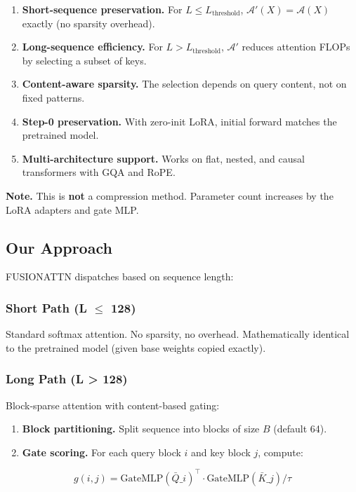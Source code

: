 \begin{enumerate}
\item \textbf{Short-sequence preservation.} For $L \leq L_\text{threshold}$,
  $\mathcal{A}'(X) = \mathcal{A}(X)$ exactly (no sparsity overhead).
\item \textbf{Long-sequence efficiency.} For $L > L_\text{threshold}$,
  $\mathcal{A}'$ reduces attention FLOPs by selecting a subset of keys.
\item \textbf{Content-aware sparsity.} The selection depends on query content, not
  on fixed patterns.
\item \textbf{Step-0 preservation.} With zero-init LoRA, initial forward matches
  the pretrained model.
\item \textbf{Multi-architecture support.} Works on flat, nested, and causal
  transformers with GQA and RoPE.

\end{enumerate}
\textbf{Note.} This is \textbf{not} a compression method. Parameter count increases 
by the LoRA adapters and gate MLP.

\subsection{Our Approach}

FUSIONATTN dispatches based on sequence length:

\subsubsection{Short Path (L $\le$ 128)}

Standard softmax attention. No sparsity, no overhead. Mathematically 
identical to the pretrained model (given base weights copied exactly).

\subsubsection{Long Path (L \textgreater{} 128)}

Block-sparse attention with content-based gating:

\begin{enumerate}
\item \textbf{Block partitioning.} Split sequence into blocks of size $B$ (default
  64).
\item \textbf{Gate scoring.} For each query block $i$ and key block $j$, compute:

\end{enumerate}
\[
g(i, j) = \text{GateMLP}(\bar{Q}\_i)^\top \cdot \text{GateMLP}(\bar{K}\_j) / \tau
\tag{1.2}
\]

